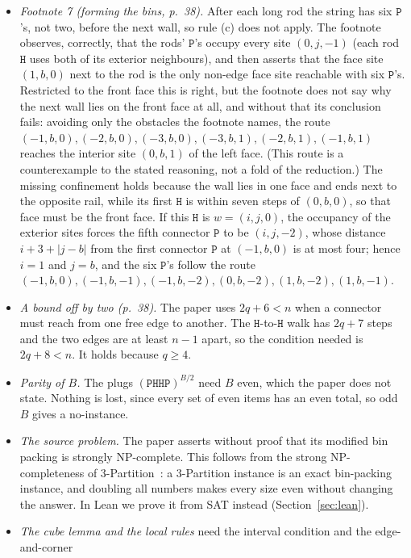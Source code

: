 \documentclass[11pt,letterpaper]{article}
\theoremstyle{definition}
\theoremstyle{remark}
\newcommand{\Hh}{\mathtt{H}}
\newcommand{\Pp}{\mathtt{P}}
\begin{document}
\begin{itemize}
  \item \emph{Footnote 7 (forming the bins, p.~38).} After each long rod the string has six $\Pp$'s,
    not two, before the next wall, so rule (c) does not apply. The footnote observes, correctly,
    that the rods' $\Pp$'s occupy every site $(0,j,-1)$ (each rod $\Hh$ uses both of its exterior
    neighbours), and then asserts that the face site $(1,b,0)$ next to the rod is the only non-edge
    face site reachable with six $\Pp$'s. Restricted to the front face this is right, but the
    footnote does not say why the next wall lies on the front face at all, and without that its
    conclusion fails: avoiding only the obstacles the footnote names, the route
    $(-1,b,0),(-2,b,0),(-3,b,0),(-3,b,1),(-2,b,1),(-1,b,1)$ reaches the interior site $(0,b,1)$ of
    the left face. (This route is a counterexample to the stated reasoning, not a fold of the
    reduction.) The missing confinement holds because the wall lies in one face and ends next to the
    opposite rail, while its first $\Hh$ is within seven steps of $(0,b,0)$, so that face must be
    the front face. If this $\Hh$ is
    $w=(i,j,0)$, the occupancy of the exterior sites forces the fifth connector $\Pp$ to be
    $(i,j,-2)$, whose distance $i+3+|j-b|$ from the first connector $\Pp$ at $(-1,b,0)$ is at most four;
    hence $i=1$ and $j=b$, and the six $\Pp$'s follow the route
    $(-1,b,0),(-1,b,-1),(-1,b,-2),(0,b,-2),(1,b,-2),(1,b,-1)$.
  \item \emph{A bound off by two (p.~38).} The paper uses $2q+6<n$ when a connector must reach from
    one free edge to another. The $\Hh$-to-$\Hh$ walk has $2q+7$ steps and the two edges are at least
    $n-1$ apart, so the condition needed is $2q+8<n$. It holds because $q\ge4$.
  \item \emph{Parity of $B$.} The plugs $(\Pp\Hh\Hh\Pp)^{B/2}$ need $B$ even, which the paper does not
    state. Nothing is lost, since every set of even items has an even total, so odd $B$ gives a
    no-instance.
  \item \emph{The source problem.} The paper asserts without proof that its modified bin packing is
    strongly NP-complete. This follows from the strong NP-completeness of 3-Partition~\cite{GJ79}: a
    3-Partition instance is an exact bin-packing instance, and doubling all numbers makes every size
    even without changing the answer. In Lean we prove it from SAT instead (Section~\ref{sec:lean}).
  \item \emph{The cube lemma and the local rules} need the interval condition and the edge-and-corner

\end{itemize}
\end{document}
